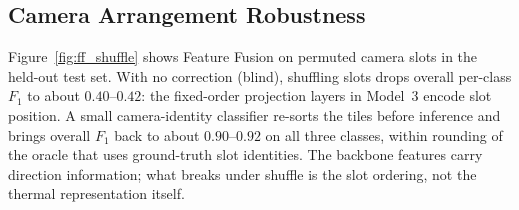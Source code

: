 \subsection{Camera Arrangement Robustness}

Figure~\ref{fig:ff_shuffle} shows Feature Fusion on permuted camera slots in the
held-out test set. With no correction (blind), shuffling slots drops overall
per-class $F_1$ to about $0.40$--$0.42$: the fixed-order projection layers in
Model~3 encode slot position. A small camera-identity classifier re-sorts the
tiles before inference and brings overall $F_1$ back to about $0.90$--$0.92$ on
all three classes, within rounding of the oracle that uses ground-truth slot
identities. The backbone features carry direction information; what breaks under
shuffle is the slot ordering, not the thermal representation itself.
